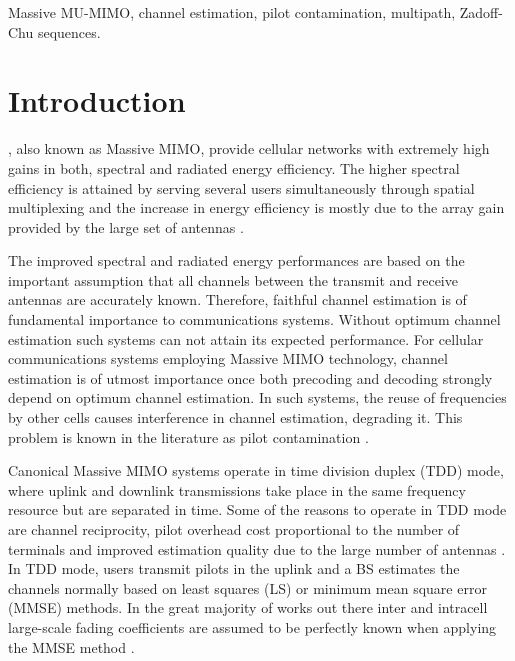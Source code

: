 \documentclass[journal,12pt,onecolumn]{IEEEtran}
\begin{document}
\begin{IEEEkeywords}
Massive MU-MIMO, channel estimation, pilot contamination, multipath, Zadoff-Chu sequences.
\end{IEEEkeywords}

\section{Introduction}
, also known as Massive MIMO, provide cellular networks with extremely high gains in both, spectral and radiated energy efficiency. The higher spectral efficiency is attained by serving several users simultaneously through spatial multiplexing and the increase in energy efficiency is mostly due to the array gain provided by the large set of antennas \cite{marzetta:noncooperative, larsson:mmimo_next_gen}. 

The improved spectral and radiated energy performances are based on the important assumption that all channels between the transmit and receive antennas are accurately known. Therefore, faithful channel estimation is of fundamental importance to communications systems. Without optimum channel estimation such systems can not attain its expected performance. For cellular communications systems employing Massive MIMO technology, channel estimation is of utmost importance once both precoding and decoding strongly depend on optimum channel estimation. In such systems, the reuse of frequencies by other cells causes interference in channel estimation, degrading it. This problem is known in the literature as pilot contamination \cite{marzetta:noncooperative, marzetta:pilotContamination}.

Canonical Massive MIMO systems operate in time division duplex (TDD) mode, where uplink and downlink transmissions take place in the same frequency resource but are separated in time. Some of the reasons to operate in TDD mode are channel reciprocity, pilot overhead cost proportional to the number of terminals and improved estimation quality due to the large number of antennas \cite{marzetta:pilotContamination, emil:10_myths, marzetta:book}. In TDD mode, users transmit pilots in the uplink and a BS estimates the channels normally based on least squares (LS) \cite{Gesbert:coordinated} or minimum mean square error (MMSE) \cite{Debbah:howmanyantennas, Marzetta:finitedimensionalchannels} methods. In the great majority of works out there inter and intracell large-scale fading coefficients are assumed to be perfectly known when applying the MMSE method \cite{Ashikhmi:interference_reduction}.
\end{document}
